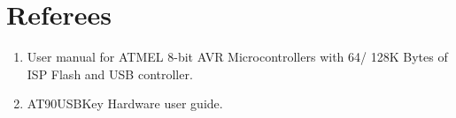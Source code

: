\section{Referees}\label{sec:intro}          
\begin{enumerate}
	\item User manual for ATMEL 8-bit AVR Microcontrollers with 64/ 128K Bytes of ISP Flash and USB controller.
	\item AT90USBKey Hardware user guide.
\end{enumerate}